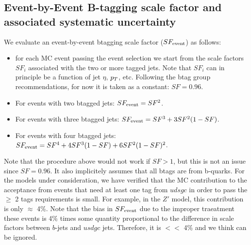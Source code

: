 \subsection{Event-by-Event B-tagging scale factor and associated systematic uncertainty}
We evaluate an event-by-event btagging scale factor ($SF_{\rm event}$) as follows:

\begin{itemize}
\item for each MC event passing the event selection we start
from the scale factors $SF_i$ associated with the two or more
tagged jets.  Note that $SF_i$ can in principle be a function 
of jet $\eta$, $p_T$, etc.  Following the btag group recommendations,
for now it is taken as a constant: $SF=0.96$.

\item For events with two btagged jets: $SF_{\rm event}=SF^2$.

\item For events with three btagged jets: $SF_{\rm event}=SF^3 + 3SF^2(1-SF)$.

\item For events with four btagged jets: $SF_{\rm event}=SF^4 + 4SF^3(1-SF) + 6SF^2(1-SF)^2$.
\end{itemize}

Note that the procedure above would not work if $SF>1$, but this is not an issue
since $SF=0.96$.
It also implicitely assumes that all btags are from b-quarks.  For the models under 
consideration, we have verified that the MC contribution to the acceptance from 
events that need at least one tag from $udsgc$ in order to pass the $\ge$ 2 tags 
requirements is small.  For example, in the $Z'$ model, this contribution is
only $\approx$ 4\%.  Note that the bias in $SF_{\rm event}$ due to the improper traeatment
these events is 4\% times some quantity proportional to the difference in scale 
factors between $b$-jets and $usdgc$ jets.  Therefore, it is $<<$ 4\% and we think
can be ignored.  

